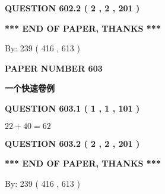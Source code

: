 \documentclass{ctexart}
\begin{document}
 
  
\vspace{0.2in}
  
{\textbf{\Large{QUESTION
602.2 
 ( 2 , 2 , 201 )
}}}
  
  
   
   
 \vspace{0.2in}
 
   
   
   
   
\vspace{1.0in} 
{\textbf{\large{ *** END OF PAPER, THANKS *** }}} 
   
   
\hspace{1.0in} By: 
 239 ( 416 ,  613 )
   
   
   
   
\newpage 
\setcounter{page}{ 
   603001 } 
   
   
   
   
 {\textbf{ \Large{ PAPER NUMBER  603  }}}
   
   
\vspace{0.2in}
   
   
   
   
   
   
 \vspace{0.2in}
{\LARGE {\textbf{ 一个快速卷例}}}
   
   
  
\vspace{0.2in}
  
{\textbf{\Large{QUESTION
603.1 
 ( 1 , 1 , 101 )
}}}
  
  
 
 

$ %
22 +  %
40=   %
62$
 
 
  
\vspace{0.2in}
  
{\textbf{\Large{QUESTION
603.2 
 ( 2 , 2 , 201 )
}}}
  
  
   
   
 \vspace{0.2in}
 
   
   
   
   
\vspace{1.0in} 
{\textbf{\large{ *** END OF PAPER, THANKS *** }}} 
   
   
\hspace{1.0in} By: 
 239 ( 416 ,  613 )
   
\end{document}
